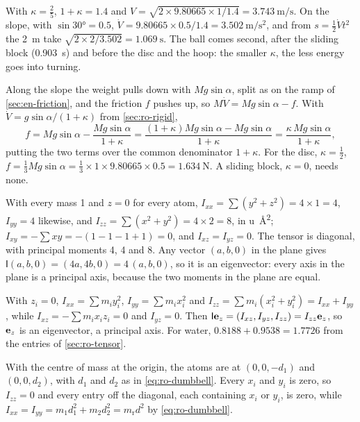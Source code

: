 With $\kappa = \frac25$, $1 + \kappa = 1.4$ and $V =
\sqrt{2\times9.80665\times1/1.4} = \SI{3.743}{\metre\per\second}$. On the
slope, with $\sin\ang{30} = 0.5$, $\dot V = 9.80665\times0.5/1.4 = \SI{3.502}{\metre\per\second
\squared}$, and from $s = \frac12\dot{V}t^2$ the \SI{2}{\metre} take
$\sqrt{2\times2/3.502} = \SI{1.069}{\second}$. The ball comes second,
after the sliding block (\SI{0.903}{\second}) and before the disc and the
hoop: the smaller $\kappa$, the less energy goes into turning.

Along the slope the weight pulls down with $Mg
\sin\alpha$, split as on the ramp of \cref{sec:en-friction}, and the friction $f$ pushes up, so $M\dot{V} = Mg\sin\alpha -
f$. With $\dot V = g\sin\alpha/(1 + \kappa)$ from \cref{sec:ro-rigid},
\begin{equation*}
   f = Mg\sin\alpha - \frac{Mg\sin\alpha}{1 + \kappa}
   = \frac{(1 + \kappa)Mg\sin\alpha - Mg\sin\alpha}{1 + \kappa}
   = \frac{\kappa\,Mg\sin\alpha}{1 + \kappa} ,
\end{equation*}
putting the two terms over the common denominator $1 + \kappa$. For the
disc, $\kappa = \frac12$, $f = \frac13 Mg\sin\alpha = \frac13\times1\times
9.80665\times0.5 = \SI{1.634}{\newton}$. A sliding block, $\kappa = 0$,
needs none.

With every mass 1 and $z = 0$ for every atom, $I_{xx} = \sum(y^2 +
z^2) = 4\times1 = 4$, $I_{yy} = 4$ likewise, and $I_{zz} = \sum(x^2 + y^2)
= 4\times2 = 8$, in \si{\amu\angstrom\squared}; $I_{xy} = -\sum xy =
-(1 - 1 - 1 + 1) = 0$, and $I_{xz} = I_{yz} = 0$. The tensor is diagonal,
with principal moments 4, 4 and 8. Any vector $(a, b, 0)$ in the plane
gives $\mathsf{I}(a, b, 0) = (4a, 4b, 0) = 4\,(a, b, 0)$, so it is an
eigenvector: every axis in the plane is a principal axis, because the two
moments in the plane are equal.

With $z_i = 0$, $I_{xx} = \sum m_iy_i^2$, $I_{yy} =
\sum m_ix_i^2$ and $I_{zz} = \sum m_i(x_i^2 + y_i^2) = I_{xx} + I_{yy}$,
while $I_{xz} = -\sum m_ix_iz_i = 0$ and $I_{yz} = 0$. Then $\mathsf{I}
\bm{\mathrm{e}}_z = (I_{xz}, I_{yz}, I_{zz}) = I_{zz}\bm{\mathrm{e}}_z$, so $\bm{\mathrm{e}}_z$ is an
eigenvector, a principal axis. For water, $0.8188 + 0.9538 = 1.7726$ from
the entries of \cref{sec:ro-tensor}.

With the centre of mass at the origin, the atoms
are at $(0, 0, -d_1)$ and $(0, 0, d_2)$, with $d_1$ and $d_2$ as in
\cref{eq:ro-dumbbell}. Every $x_i$ and $y_i$ is zero, so $I_{zz} = 0$ and
every entry off the diagonal, each containing $x_i$ or $y_i$, is zero,
while $I_{xx} = I_{yy} = m_1d_1^2 + m_2d_2^2 = m_{\mathrm r}d^2$ by
\cref{eq:ro-dumbbell}.

